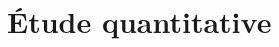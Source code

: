 %
%
\section{Étude quantitative}

\newcommand{\qnum}[1]{{\sffamily\bfseries\color{insarouge}Q#1}}
\newcommand{\qq}[3]{\qnum{#1}\hspace{0.3em}#2\ {\color{insagris}\itshape#3}\par}
\newcommand{\qsec}[2]{\begingroup\footnotesize\sffamily\bfseries{\color{insarouge}#1}\hspace{0.4em}#2\par\endgroup\vspace{1.5pt}}
\newcommand{\qvide}{\cellcolor{insabeige}}

